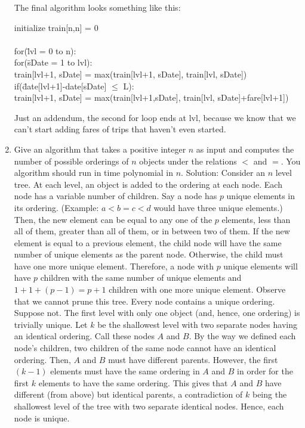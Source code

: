 \documentclass{article}
\begin{document}
\begin{enumerate}
The final algorithm looks something like this:
\begin{tabbing}
initialize train[n,n] = 0\\
\\
for(\=lvl = 0 to n):\\
\>	for(\=sDate = 1 to lvl):\\
\>\>	train[lvl+1, sDate] = max(train[lvl+1, sDate], train[lvl, sDate])\\
\>\>	if(\=date[lvl+1]-date[sDate] $\le$ L): \\
\>\>\>	train[lvl+1, sDate] = max(train[lvl+1,sDate], train[lvl, sDate]+fare[lvl+1])\\
\end{tabbing}
Just an addendum, the second for loop ends at lvl, because we know that we can't start adding fares of trips that haven't even started.
\newline
\setcounter{enumi}{25}
\item Give an algorithm that takes a positive integer $n$ as input and computes the number of possible orderings of $n$ objects under the relations $<$ and $=$. You algorithm should run in time polynomial in $n$.
\newline
\newline Solution: Consider an $n$ level tree. At each level, an object is added to the ordering at each node. Each node has a variable number of children. Say a node has $p$ unique elements in its ordering. (Example: $a<b=c<d$ would have three unique elements.) Then, the new element can be equal to any one of the $p$ elements, less than all of them, greater than all of them, or in between two of them. If the new element is equal to a previous element, the child node will have the same number of unique elements as the parent node. Otherwise, the child must have one more unique element. Therefore, a node with $p$ unique elements will have $p$ children with the same number of unique elements and $1+1+(p-1)=p+1$ children with one more unique element.
\newline
\newline Observe that we cannot prune this tree. Every node contains a unique ordering. Suppose not. The first level with only one object (and, hence, one ordering) is trivially unique. Let $k$ be the shallowest level with two separate nodes having an identical ordering. Call these nodes $A$ and $B$. By the way we defined each node's children, two children of the same node cannot have an identical ordering. Then, $A$ and $B$ must have different parents. However, the first $(k-1)$ elements must have the same ordering in $A$ and $B$ in order for the first $k$ elements to have the same ordering. This gives that $A$ and $B$ have different (from above) but identical parents, a contradiction of $k$ being the shallowest level of the tree with two separate identical nodes. Hence, each node is unique.

\end{enumerate}
\end{document}
